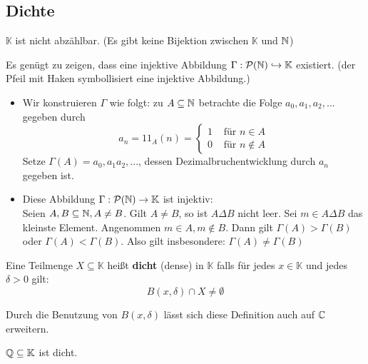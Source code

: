\documentclass[main.tex]{subfiles}
\begin{document}
\subsection{Dichte}

\begin{Theorem}
  $\mathbb{K}$ ist nicht abzählbar. (Es gibt keine Bijektion zwischen $\mathbb{K}$ und $\mathbb{N}$)
\end{Theorem}

\begin{Beweis}
  Es genügt zu zeigen, dass eine injektive Abbildung $ \Gamma : \mathcal{P}(\mathbb{N}) \hookrightarrow \mathbb{K}$ existiert. (der Pfeil mit Haken symbollisiert eine injektive Abbildung.)
  \begin{itemize}
    \item Wir konstruieren $\Gamma$ wie folgt: zu $A \subseteq \mathbb{N}$ betrachte die Folge $a_0,a_1,a_2,...$ gegeben durch $$a_n = 1\!\!\!1_A (n) = \left\{ \begin{aligned} 1 &\text{ für } n\in A \\ 0 &\text{ für } n \notin A \end{aligned}\right.$$
    Setze $\Gamma(A) = a_0,a_1a_2,...$, dessen Dezimalbruchentwicklung durch $a_n$ gegeben ist.
    \item Diese Abbildung $ \Gamma : \mathcal{P}(\mathbb{N}) \to \mathbb{K}$ ist injektiv:\\
    Seien $A,B \subseteq \mathbb{N}, A \neq B$. Gilt $A \neq B$, so ist $A \Delta B$ nicht leer. Sei $m \in A \Delta B$ das kleinste Element. Angenommen $m \in A, m \notin B$. Dann gilt $\Gamma(A) > \Gamma(B)$ oder $\Gamma(A) < \Gamma(B)$. Also gilt insbesondere: $\Gamma(A) \neq \Gamma(B)$
  \end{itemize}
\end{Beweis}

\begin{Definition}[Dichtheit]
  Eine Teilmenge $X \subseteq \mathbb{K}$ heißt \textbf{dicht} (dense) in $\mathbb{K}$ falls für jedes $x \in \mathbb{K}$ und jedes $\delta > 0$ gilt:
  $$B(x,\delta) \cap X \neq \emptyset$$
\end{Definition}

\begin{Bemerkung}
  Durch die Benutzung von $B(x,\delta)$ lässt sich diese Definition auch auf $\mathbb{C}$ erweitern.
\end{Bemerkung}

\begin{Theorem}
  $\mathbb{Q} \subseteq \mathbb{K}$ ist dicht.
\end{Theorem}
\end{document}
